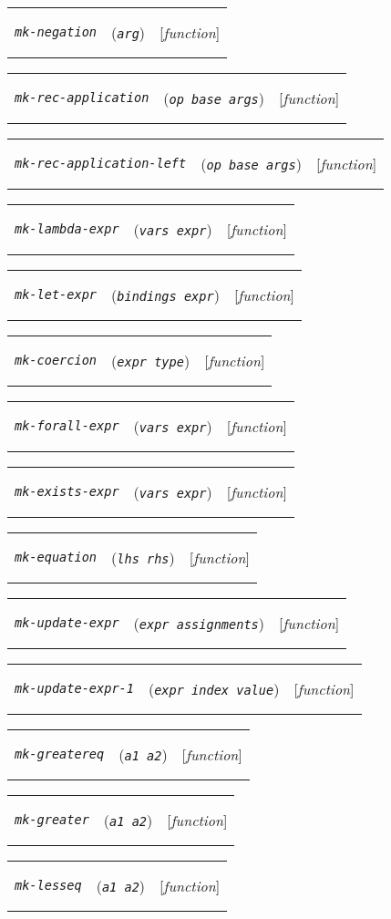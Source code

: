 \documentclass[12pt]{book}
\makeatletter
\newenvironment{function}[3]%
{\par\noindent\begin{boxedminipage}{\textwidth}%
 \par\noindent\begin{tabularx}{\linewidth}{l>{\raggedright}Xr}%
 \functionhtgt{#1}&(\texttt{\textit{#2}})&[\emph{#3}]%
 \end{tabularx}\par\flushright\begin{minipage}{.97\textwidth}}
{\end{minipage}\end{boxedminipage}}
\newcommand{\functionnm}[1]{\texttt{\textit{#1}}}
\newcommand{\functionhtgt}[1]{\hypertarget{#1}{\functionnm{#1}}\index{#1@\functionnm{#1}|underline}}
\newenvironment{lispfunction}[2]%
{\begin{function}{#1}{#2}{function}}{\end{function}}
\makeatother
\begin{document}
\begin{lispfunction}{mk-negation}{arg}
\end{lispfunction}

\begin{lispfunction}{mk-rec-application}{op base args}
\end{lispfunction}

\begin{lispfunction}{mk-rec-application-left}{op base args}
\end{lispfunction}

\begin{lispfunction}{mk-lambda-expr}{vars expr}
\end{lispfunction}

\begin{lispfunction}{mk-let-expr}{bindings expr}
\end{lispfunction}

\begin{lispfunction}{mk-coercion}{expr type}
\end{lispfunction}

\begin{lispfunction}{mk-forall-expr}{vars expr}
\end{lispfunction}

\begin{lispfunction}{mk-exists-expr}{vars expr}
\end{lispfunction}

\begin{lispfunction}{mk-equation}{lhs rhs}
\end{lispfunction}

\begin{lispfunction}{mk-update-expr}{expr assignments}
\end{lispfunction}

\begin{lispfunction}{mk-update-expr-1}{expr index value}
\end{lispfunction}

\begin{lispfunction}{mk-greatereq}{a1 a2}
\end{lispfunction}

\begin{lispfunction}{mk-greater}{a1 a2}
\end{lispfunction}

\begin{lispfunction}{mk-lesseq}{a1 a2}
\end{lispfunction}
\end{document}
